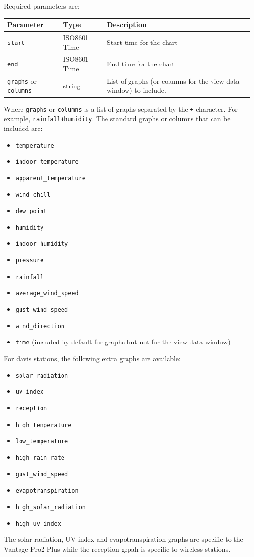 \documentclass[a4paper,10pt]{book}
\begin{document}
Required parameters are:

\begin{tabular}{p{3.5cm} p{2.5cm} p{7.6cm}}
\hline
\textbf{Parameter} & \textbf{Type} & \textbf{Description} \\
\hline
\verb|start| & ISO8601 Time & Start time for the chart \\
\verb|end| & ISO8601 Time & End time for the chart \\
\verb|graphs| or \verb|columns|& string & List of graphs (or columns for the view data window) to include.\\
\hline
\end{tabular}

Where \verb|graphs| or \verb|columns| is a list of graphs separated by the \verb|+| character. For example, \verb|rainfall+humidity|. The standard graphs or columns that can be included are:
\begin{itemize}
\item \verb|temperature|
\item \verb|indoor_temperature|
\item \verb|apparent_temperature|
\item \verb|wind_chill|
\item \verb|dew_point|
\item \verb|humidity|
\item \verb|indoor_humidity|
\item \verb|pressure|
\item \verb|rainfall|
\item \verb|average_wind_speed|
\item \verb|gust_wind_speed|
\item \verb|wind_direction|
\item \verb|time| (included by default for graphs but not for the view data window)
\end{itemize}

For davis stations, the following extra graphs are available:
\begin{itemize}
\item \verb|solar_radiation|
\item \verb|uv_index|        
\item \verb|reception|
\item \verb|high_temperature|
\item \verb|low_temperature|
\item \verb|high_rain_rate|      
\item \verb|gust_wind_speed|
\item \verb|evapotranspiration|  
\item \verb|high_solar_radiation|
\item \verb|high_uv_index|
\end{itemize}
The solar radiation, UV index and evapotranspiration graphs are specific to the Vantage Pro2 Plus while the reception grpah is specific to wireless stations.
\end{document}
